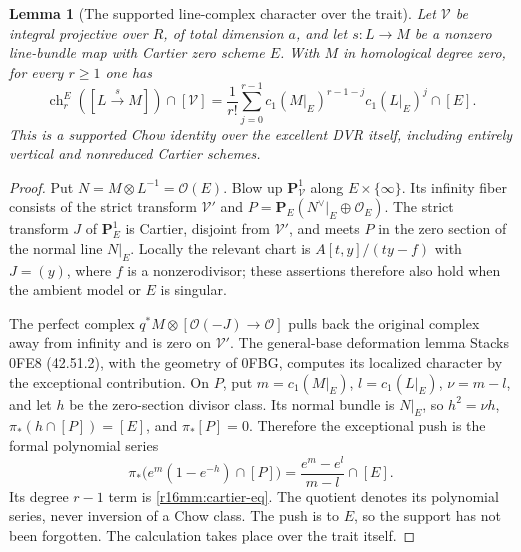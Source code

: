 \documentclass[11pt,a4paper]{article}
\newtheorem{lemma}[theorem]{Lemma}
\theoremstyle{definition}
\theoremstyle{remark}
\numberwithin{equation}{section}
\begin{document}
\begin{lemma}[The supported line-complex character over the trait]
\label{r16mm:cartier}
Let $\mathcal V$ be integral projective over $R$, of total
dimension $a$, and let $s:L\to M$ be a nonzero line-bundle
map with Cartier zero scheme $E$. With $M$ in homological
degree zero, for every $r\geq1$ one has
\[
 \operatorname{ch}_r^E([L\xrightarrow{s}M])\cap[\mathcal V]
  =\frac1{r!}\sum_{j=0}^{r-1}
        c_1(M|_E)^{r-1-j}c_1(L|_E)^j\cap[E].
 \tag{MM16.2}\label{r16mm:cartier-eq}
\]
This is a supported Chow identity over the excellent DVR itself,
including entirely vertical and nonreduced Cartier schemes.
\end{lemma}

\begin{proof}
Put $N=M\otimes L^{-1}=\mathcal O(E)$. Blow up
$\mathbf P^1_{\mathcal V}$ along $E\times\{\infty\}$.
Its infinity fiber consists of the strict transform
$\mathcal V'$ and $P=\mathbf P_E(N^\vee|_E\oplus\mathcal O_E)$.
The strict transform $J$ of $\mathbf P^1_E$ is Cartier, disjoint
from $\mathcal V'$, and meets $P$ in the zero section of the
normal line $N|_E$. Locally the relevant chart is
$A[t,y]/(ty-f)$ with $J=(y)$, where $f$ is a nonzerodivisor;
these assertions therefore also hold when the ambient model
or $E$ is singular.

The perfect complex $q^*M\otimes[\mathcal O(-J)\to\mathcal O]$
pulls back the original complex away from infinity and is zero
on $\mathcal V'$. The general-base deformation lemma Stacks
0FE8 (42.51.2), with the geometry of 0FBG, computes its localized
character by the exceptional contribution. On $P$, put
$m=c_1(M|_E)$, $l=c_1(L|_E)$, $\nu=m-l$, and let $h$ be
the zero-section divisor class. Its normal bundle is $N|_E$,
so $h^2=\nu h$, $\pi_*(h\cap[P])=[E]$, and $\pi_*[P]=0$.
Therefore the exceptional push is the formal polynomial series
\[
       \pi_*\bigl(e^m(1-e^{-h})\cap[P]\bigr)
                   =\frac{e^m-e^l}{m-l}\cap[E].
\]
Its degree $r-1$ term is \eqref{r16mm:cartier-eq}. The quotient
denotes its polynomial series, never inversion of a Chow class.
The push is to $E$, so the support has not been forgotten.
The calculation takes place over the trait itself.
\end{proof}
\end{document}
